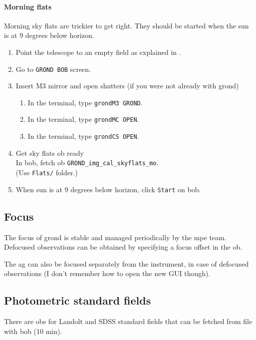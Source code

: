 \documentclass[11pt,fleqn,a4paper]{book}
\begin{document}
\paragraph{Morning flats}
Morning \gls{sky flats} are trickier to get right. They should be started when the sun is at 9 degrees below horizon.

\begin{enumerate}
  \item Point the telescope to an empty field as explained in .
  \item Go to \texttt{GROND BOB} screen.
  \item Insert \gls{M3} mirror and open shutters (if you were not already with \gls{grond})
     \begin{enumerate}
       \item In the terminal, type \texttt{\gls{grondM3} GROND}.
       \item In the terminal, type \texttt{\gls{grondMC} OPEN}.
       \item In the terminal, type \texttt{\gls{grondCS} OPEN}.
     \end{enumerate}
  \item Get \gls{sky flats} \gls{ob} ready\\
        In \gls{bob}, fetch \gls{ob} \texttt{GROND\_img\_cal\_skyflats\_mo}.\\
               (Use \texttt{Flats/} folder.)
  \item When sun is at 9 degrees below horizon, click \texttt{Start} on \gls{bob}.
\end{enumerate}

\subsection{Focus}

The \gls{focus} of \gls{grond} is stable and managed periodically by the \gls{mpe} team.  Defocused observations can be obtained by specifying a \gls{focus} offset in the \gls{ob}.

The \gls{ag} can also be focused separately from the instrument, in case of defocused observations (I don't remember how to open the new GUI though).


\subsection{Photometric standard fields}

There are \glspl{ob} for Landolt and SDSS \glspl{standard field} that can be fetched from file with \gls{bob} (10 min).
\end{document}

